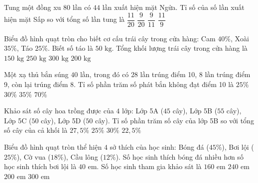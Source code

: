 \begin{ex} %
Tung một đồng xu $80$ lần có $44$ lần xuất hiện mặt Ngửa. Tỉ số của số lần xuất hiện mặt Sấp so với tổng số lần tung là
\choice
{$\dfrac{11}{20}$}
{\True $\dfrac{9}{20}$}
{$\dfrac{9}{11}$}
{$\dfrac{11}{9}$}
\end{ex}

\begin{ex} %
Biểu đồ hình quạt tròn cho biết cơ cấu trái cây trong cửa hàng: Cam $40\%$, Xoài $35\%$, Táo $25\%$. Biết số táo là $50\text{ kg}$. Tổng khối lượng trái cây trong cửa hàng là
\choice
{$150\text{ kg}$}
{$250\text{ kg}$}
{$300\text{ kg}$}
{\True $200\text{ kg}$}
\end{ex}

\begin{ex} %
Một xạ thủ bắn súng $40$ lần, trong đó có $28$ lần trúng điểm 10, $8$ lần trúng điểm 9, còn lại trúng điểm 8. Tỉ số phần trăm số phát bắn không đạt điểm 10 là
\choice
{$25\%$}
{\True $30\%$}
{$35\%$}
{$70\%$}
\end{ex}

\begin{ex} %
Khảo sát số cây hoa trồng được của $4$ lớp: Lớp 5A ($45$ cây), Lớp 5B ($55$ cây), Lớp 5C ($50$ cây), Lớp 5D ($50$ cây). Tỉ số phần trăm số cây của lớp 5B so với tổng số cây của cả khối là
\choice
{\True $27{,}5\%$}
{$25\%$}
{$30\%$}
{$22{,}5\%$}
\end{ex}

\begin{ex} %
Biểu đồ hình quạt tròn thể hiện $4$ sở thích của học sinh: Bóng đá ($45\%$), Bơi lội ($25\%$), Cờ vua ($18\%$), Cầu lông ($12\%$). Số học sinh thích bóng đá nhiều hơn số học sinh thích bơi lội là $40$ em. Số học sinh tham gia khảo sát là
\choice
{$160$ em}
{$240$ em}
{\True $200$ em}
{$300$ em}
\end{ex}

